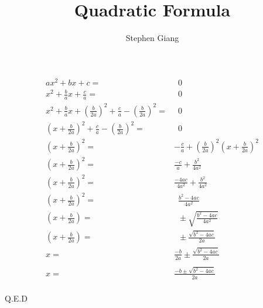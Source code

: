 \documentclass{article}
\title{Quadratic Formula}
\author{Stephen Giang}
\begin{document}
	
\maketitle

\begin{align*}
	{ax^{2} + bx + c} = & \enspace 0\\
	x^{2} + \frac{b}{a}x + \frac{c}{a} = & \enspace 0\\
	x^{2} + \frac{b}{a}x + \left( \frac{b}{2a}\right)^{2} + \frac{c}{a} - \left( \frac{b}{2a}\right)^{2}= &\enspace 0\\
	\left( x + \frac{b}{2a} \right)^{2} + \frac{c}{a} - \left( \frac{b}{2a}\right)^{2}= &\enspace 0\\
	\left( x + \frac{b}{2a} \right)^{2} = &-\frac{c}{a} + \left( \frac{b}{2a}\right)^{2}
	\left( x + \frac{b}{2a} \right)^{2} \\
	\left( x + \frac{b}{2a} \right)^{2} = &  \frac{-c}{a} + \frac{b^{2}}{4a^{2}}\\
	\left( x + \frac{b}{2a} \right)^{2} = &  \frac{-4ac}{4a^{2}} + \frac{b^{2}}{4a^{2}}\\
	\left( x + \frac{b}{2a} \right)^{2} = &\enspace \frac{b^{2} - 4ac}{4a^{2}} \\
	\left( x + \frac{b}{2a} \right) = & \enspace\pm \sqrt{\frac{b^{2} - 4ac}{4a^{2}}}\\
	\left( x + \frac{b}{2a} \right) = & \enspace\pm \frac{\sqrt{b^{2} - 4ac}}{2a}\\
	x = & \frac{-b}{2a} \pm \frac{ \sqrt{b^{2} - 4ac}}{2a}\\\\
	x = & \frac{-b \pm \sqrt{b^{2} - 4ac}}{2a}\\
\end{align*}
\begin{center}
	Q.E.D
\end{center}
\end{document}
